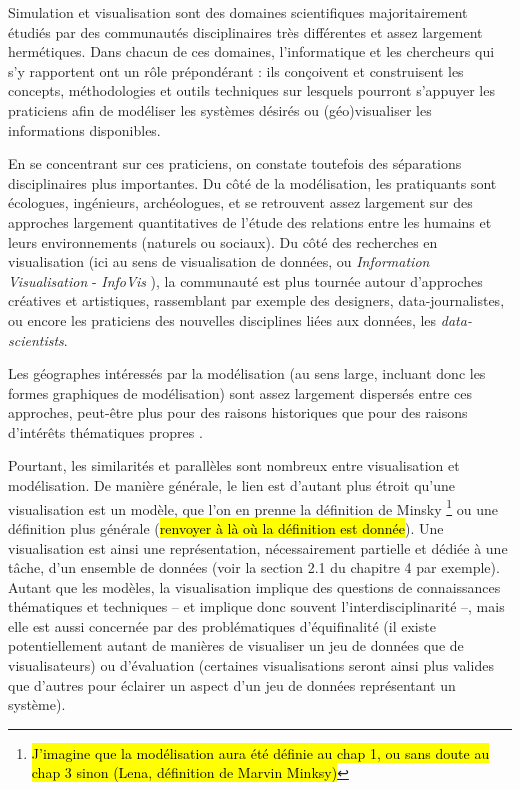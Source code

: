 \documentclass[a4paper, 12pt]{article}
\begin{document}
Simulation et visualisation sont des domaines scientifiques majoritairement étudiés par des communautés disciplinaires très différentes et assez largement hermétiques.
Dans chacun de ces domaines, l'informatique et les chercheurs qui s'y rapportent ont un rôle prépondérant : ils conçoivent et construisent les concepts, méthodologies et outils techniques sur lesquels pourront s'appuyer les praticiens afin de modéliser les systèmes désirés ou (géo)visualiser les informations disponibles.

En se concentrant sur ces praticiens, on constate toutefois des séparations disciplinaires plus importantes.
Du côté de la modélisation, les pratiquants sont écologues, ingénieurs, archéologues, et se retrouvent assez largement sur des approches largement quantitatives de l'étude des relations entre les humains et leurs environnements (naturels ou sociaux).
Du côté des recherches en visualisation (ici au sens de visualisation de données, ou \og \textit{Information Visualisation} - \textit{InfoVis} \fg{}), la communauté est plus tournée autour d'approches créatives et artistiques, rassemblant par exemple des designers, \og data-journalistes\fg{}, ou encore les praticiens des nouvelles disciplines liées aux données, les \textit{data-scientists}.

Les géographes intéressés par la modélisation (au sens large, incluant donc les formes graphiques de modélisation) sont assez largement dispersés entre ces approches, peut-être plus pour des raisons historiques que pour des raisons d'intérêts thématiques propres
.

Pourtant, les similarités et parallèles sont nombreux entre visualisation et modélisation.
De manière générale, le lien est d'autant plus étroit qu'une visualisation est un modèle, que l'on en prenne la définition de Minsky
\footnote{
\hl{J'imagine que la modélisation aura été définie au chap 1, ou sans doute au chap 3 sinon (Lena, définition de Marvin Minksy)}
} ou une définition plus générale (\hl{renvoyer à là où la définition est donnée}).
Une visualisation est ainsi une représentation, nécessairement partielle et dédiée à une tâche, d'un ensemble de données (voir la section 2.1 du chapitre 4 par exemple).
Autant que les modèles, la visualisation implique des questions de connaissances thématiques et techniques -- et implique donc souvent l'interdisciplinarité --, mais elle est aussi concernée par des problématiques d'équifinalité (il existe potentiellement autant de manières de visualiser un jeu de données que de visualisateurs) ou d'évaluation (certaines visualisations seront ainsi plus valides que d'autres pour éclairer un aspect d'un jeu de données représentant un système).
\end{document}
